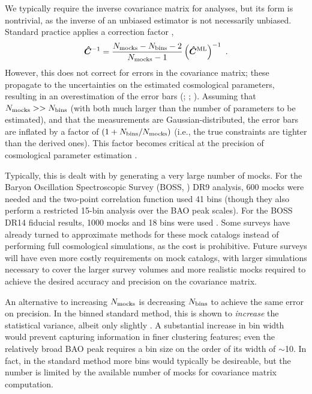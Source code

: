 We typically require the inverse covariance matrix for analyses, but its form is nontrivial, as the inverse of an unbiased estimator is not necessarily unbiased.
Standard practice applies a correction factor \citep{Hartlap2007},
\begin{equation}
\bm{\hat{C}}^{-1} = \frac{N_\mathrm{mocks}-N_\mathrm{bins}-2}{N_\mathrm{mocks}-1} \left( \bm{\hat{C}}^\mathrm{ML} \right) ^{-1} ~.
\end{equation}
However, this does not correct for errors in the covariance matrix; these propagate to the uncertainties on the estimated cosmological parameters, resulting in an overestimation of the error bars (\citealt{Dodelson2013}; \citealt{Percival2014}; \citealt{TaylorJoachimi2014}).
Assuming that $N_\mathrm{mocks} >> N_\mathrm{bins}$ (with both much larger than the number of parameters to be estimated), and that the measurements are Gaussian-distributed, the error bars are inflated by a factor of $(1 + N_\mathrm{bins}/N_\mathrm{mocks})$ (i.e., the true constraints are tighter than the derived ones).
This factor becomes critical at the precision of cosmological parameter estimation \citep{Percival2014}.

Typically, this is dealt with by generating a very large number of mocks.
For the Baryon Oscillation Spectroscopic Survey (BOSS, \citealt{Dawson2013}) DR9 analysis, 600 mocks were needed and the two-point correlation function used 41 bins \citep{Sanchez2012} (though they also perform a restricted 15-bin analysis over the BAO peak scales). 
For the BOSS DR14 fiducial \cf results, 1000 mocks and 18 bins were used \citep{ata_clustering_2018}.
Some surveys have already turned to approximate methods for these mock catalogs instead of performing full cosmological simulations, as the cost is prohibitive.
Future surveys will have even more costly requirements on mock catalogs, with larger simulations necessary to cover the larger survey volumes and more realistic mocks required to achieve the desired accuracy and precision on the covariance matrix.

An alternative to increasing $N_\mathrm{mocks}$ is decreasing $N_\mathrm{bins}$ to achieve the same error on precision.
In the binned standard method, this is shown to \emph{increase} the statistical variance, albeit only slightly \citep{Percival2014}.
A substantial increase in bin width would prevent capturing information in finer clustering features; even the relatively broad BAO peak requires a bin size on the order of its width of $\sim$10\hmpc.
In fact, in the standard method more bins would typically be desireable, but the number is limited by the available number of mocks for covariance matrix computation.

